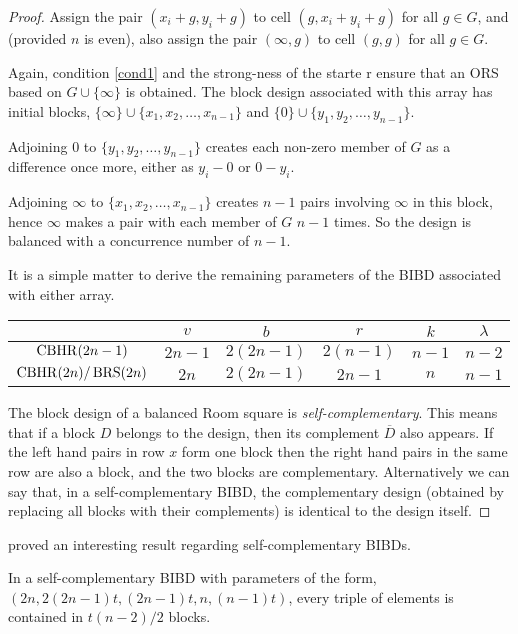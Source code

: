 \begin{proof}
Assign the pair $(x_i + g, y_i + g)$ to cell $(g, x_i + y_i + g)$ for all $g \in G$, and (provided $n$ is even), also assign the pair $(\infty, g)$ to cell $(g, g)$ for all $g \in G$.

Again, condition \ref{cond1} and the strong-ness of the starte r ensure that an ORS based on $G \cup \{\infty\}$ is obtained.
The block design associated with this array has initial blocks, $\{\infty\} \cup \{x_1, x_2, \ldots, x_{n - 1}\}$ and $\{0\} \cup \{y_1, y_2, \ldots, y_{n - 1}\}$.

Adjoining 0 to $\{y_1, y_2, \ldots, y_{n - 1}\}$ creates each non-zero member of $G$ as a difference once more, either as $y_i - 0$ or $0 - y_i$.

Adjoining $\infty$ to $\{x_1, x_2, \ldots, x_{n - 1}\}$ creates $n - 1$ pairs involving $\infty$ in this block, hence $\infty$ makes a pair with each member of $G$ $n - 1$ times.
So the design is balanced with a concurrence number of $n - 1$.

It is a simple matter to derive the remaining parameters of the BIBD associated with either array.

\begin{tabular}{cccccc}
                   &    $v$   &     $b$     &    $r$     &   $k$   & $\lambda$  \\ \hline
      $\operatorname{CBHR}(2n-1)$ & $2n - 1$ & $2(2n - 1)$ & $2(n - 1)$ & $n - 1$ &  $n - 2$   \\
$\operatorname{CBHR}(2n)/\operatorname{BRS}(2n)$ &   $2n$   & $2(2n - 1)$ &  $2n - 1$  &   $n$   &  $n - 1$
\end{tabular}

The block design of a balanced Room square is \emph{self-complementary}.
This means that if a block $D$ belongs to the design, then its complement $\overline{D}$ also appears.
If the left hand pairs in row $x$ form one block then the right hand pairs in the same row are also a block, and the two blocks are complementary.
Alternatively we can say that, in a self-complementary BIBD, the complementary design (obtained by replacing all blocks with their complements) is identical to the design itself.
\end{proof}

\cite{schellenbergBalancedRoomSquares1972}
proved an interesting result regarding self-complementary BIBDs.

\begin{theorem}
In a self-complementary BIBD with parameters of the form, $(2n, 2(2n - 1)t, (2n - 1)t, n, (n - 1)t)$, every triple of elements is contained in $t(n - 2)/2$ blocks.
\end{theorem}

